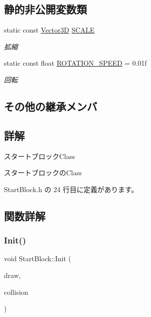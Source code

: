 \subsection*{静的非公開変数類}
\begin{DoxyCompactItemize}
\item 
static const \mbox{\hyperlink{class_vector3_d}{Vector3D}} \mbox{\hyperlink{class_start_block_ad23708a631130ebcf6e40cf4f2afcd90}{S\+C\+A\+LE}}
\begin{DoxyCompactList}\small\item\em 拡縮 \end{DoxyCompactList}\item 
static const float \mbox{\hyperlink{class_start_block_a8c5f2b6217db28715cd0d3532849cc54}{R\+O\+T\+A\+T\+I\+O\+N\+\_\+\+S\+P\+E\+ED}} = 0.\+01f
\begin{DoxyCompactList}\small\item\em 回転 \end{DoxyCompactList}\end{DoxyCompactItemize}
\subsection*{その他の継承メンバ}


\subsection{詳解}
スタートブロック\+Class 

スタートブロックの\+Class 

 Start\+Block.\+h の 24 行目に定義があります。



\subsection{関数詳解}
\mbox{\label{class_start_block_acdcd2f5baee7e1cbf9e271315d0a83c1}} 
\subsubsection{\texorpdfstring{Init()}{Init()}}
{\footnotesize\ttfamily void Start\+Block\+::\+Init (\begin{DoxyParamCaption}\item[{\mbox{\hyperlink{class_draw_base}{Draw\+Base}} $\ast$}]{draw,  }\item[{\mbox{\hyperlink{class_collision_base}{Collision\+Base}} $\ast$}]{collision }\end{DoxyParamCaption})}



